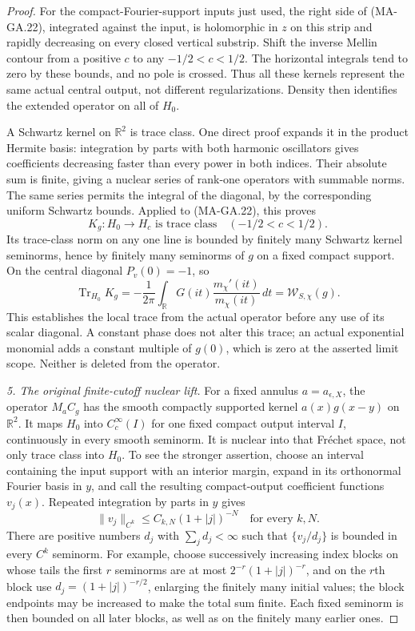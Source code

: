 \begin{proof}
For the compact-Fourier-support inputs just used, the
right side of (MA-GA.22), integrated against the input,
is holomorphic in $z$ on this strip and rapidly decreasing
on every closed vertical substrip.  Shift the inverse
Mellin contour from a positive $c$ to any
$-1/2<c<1/2$.  The horizontal integrals tend to zero by
these bounds, and no pole is crossed.  Thus all these
kernels represent the same actual central output, not
different regularizations.  Density then identifies the
extended operator on all of $H_0$.

A Schwartz kernel on $\mathbb R^2$ is trace class.  One
direct proof expands it in the product Hermite basis:
integration by parts with both harmonic oscillators
gives coefficients decreasing faster than every power
in both indices.  Their absolute sum is finite, giving
a nuclear series of rank-one operators with summable
norms.  The same series permits the integral of the
diagonal, by the corresponding uniform Schwartz bounds.
Applied to (MA-GA.22), this proves
\[
 K_g:H_0\longrightarrow H_c\text{ is trace class}
                  \quad(-1/2<c<1/2).
 \tag{MA-GA.24}
\]
Its trace-class norm on any one line is bounded by
finitely many Schwartz kernel seminorms, hence by
finitely many seminorms of $g$ on a fixed compact
support.  On the central diagonal $P_v(0)=-1$, so
\[
       \operatorname{Tr}_{H_0}K_g
          =-\frac1{2\pi}\int_{\mathbb R}
                 G(it)\frac{m_\chi'(it)}{m_\chi(it)}\,dt
          =\mathcal W_{S,\chi}(g).
 \tag{MA-GA.25}
\]
This establishes the local trace from the actual operator
before any use of its scalar diagonal.  A constant phase
does not alter this trace; an actual exponential monomial
adds a constant multiple of $g(0)$, which is zero at the
asserted limit scope.  Neither is deleted from the operator.

\emph{5. The original finite-cutoff nuclear lift.}
For a fixed annulus $a=a_{\epsilon,X}$, the operator
$M_aC_g$ has the smooth compactly supported kernel
$a(x)g(x-y)$ on $\mathbb R^2$.  It maps $H_0$ into
$C_c^\infty(I)$ for one fixed compact output interval
$I$, continuously in every smooth seminorm.  It is
nuclear into that Fr\'echet space, not only trace class
into $H_0$.  To see the stronger assertion, choose an
interval containing the input support with an interior
margin, expand in its orthonormal Fourier basis in $y$,
and call the resulting compact-output coefficient
functions $v_j(x)$.  Repeated integration by parts in
$y$ gives
\[
       \|v_j\|_{C^k}\leq C_{k,N}(1+|j|)^{-N}
                         \quad\text{for every }k,N.
 \tag{MA-GA.26}
\]
There are positive numbers $d_j$ with $\sum_jd_j<\infty$
such that $\{v_j/d_j\}$ is bounded in every $C^k$ seminorm.
For example, choose successively increasing index blocks
on whose tails the first $r$ seminorms are at most
$2^{-r}(1+|j|)^{-r}$, and on the $r$th block use
$d_j=(1+|j|)^{-r/2}$, enlarging the finitely many initial
values; the block endpoints may be increased to make
the total sum finite.  Each fixed seminorm is then
bounded on all later blocks, as well as on the finitely
many earlier ones.


\end{proof}
